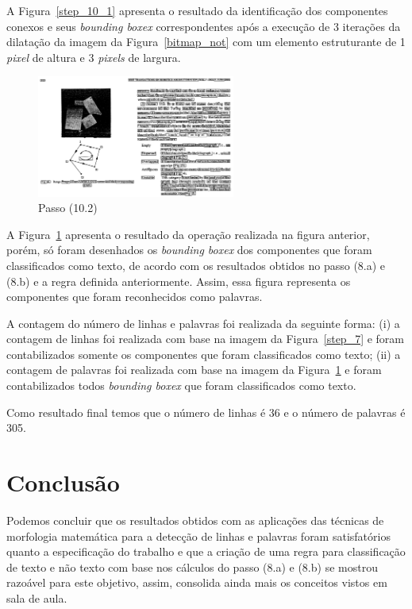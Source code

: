 \documentclass[twoside,twocolumn]{article}
\begin{document}
A Figura~\ref{step_10_1} apresenta o resultado da identificação dos componentes conexos e seus \textit{bounding boxex} correspondentes após a execução de 3 iterações da dilatação da imagem da Figura~\ref{bitmap_not} com um elemento estruturante de 1 \textit{pixel} de altura e 3 \textit{pixels} de largura.

\begin{figure}[H]
\begin{center}
	\includegraphics[height=4cm]{figures/step_10_2.png}
\caption{Passo (10.2)} \label{step_10_2}
\end{center}
\end{figure}

A Figura~\ref{step_10_2} apresenta o resultado da operação realizada na figura anterior, porém, só foram desenhados os \textit{bounding boxex} dos componentes que foram classificados como texto, de acordo com os resultados obtidos no passo (8.a) e (8.b) e a regra definida anteriormente. Assim, essa figura representa os componentes que foram reconhecidos como palavras.

A contagem do número de linhas e palavras foi realizada da seguinte forma: (i) a contagem de linhas foi realizada com base na imagem da Figura~\ref{step_7} e foram contabilizados somente os componentes que foram classificados como texto; (ii) a contagem de palavras foi realizada com base na imagem da Figura~\ref{step_10_2} e foram contabilizados todos \textit{bounding boxex} que foram classificados como texto.

Como resultado final temos que o número de linhas é 36 e o número de palavras é 305.


\section{Conclusão}

Podemos concluir que os resultados obtidos com as aplicações das técnicas de morfologia matemática para a detecção de linhas e palavras foram satisfatórios quanto a especificação do trabalho e que a criação de uma regra para classificação de texto e não texto com base nos cálculos do passo (8.a) e (8.b) se mostrou razoável para este objetivo, assim, consolida ainda mais os conceitos vistos em sala de aula.
\end{document}
